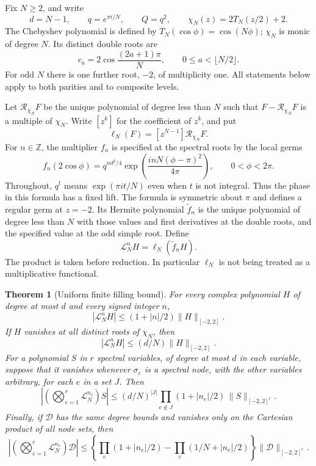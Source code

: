 \documentclass[11pt]{article}
\numberwithin{equation}{section}
\newtheorem{theorem}{Theorem}[section]
\theoremstyle{definition}\newtheorem{definition}[theorem]{Definition}
\theoremstyle{remark}\newtheorem{remark}[theorem]{Remark}
\begin{document}
Fix $N\ge2$, and write
\[
 d=N-1,\qquad q=e^{\pi i/N},\qquad Q=q^2,\qquad
 \chi_N(z)=2T_N(z/2)+2.
\]
The Chebyshev polynomial is defined by $T_N(\cos\phi)=\cos(N\phi)$;
$\chi_N$ is monic of degree $N$. Its distinct double roots are
\[
 c_a=2\cos\frac{(2a+1)\pi}{N},\qquad
 0\le a<\lfloor N/2\rfloor.
\]
For odd $N$ there is one further root, $-2$, of multiplicity one.
All statements below apply to both parities and to composite levels.

Let $\mathcal R_{\chi_N}F$ be the unique polynomial of degree less
than $N$ such that $F-\mathcal R_{\chi_N}F$ is a multiple of
$\chi_N$. Write $[z^k]$ for the coefficient of $z^k$, and put
\[
 \ell_N(F)=[z^{N-1}]\mathcal R_{\chi_N}F.
\]
For $n\in\mathbb Z$, the multiplier $f_n$ is specified at the spectral
roots by the local germs
\[
 f_n(2\cos\phi)=q^{nd^2/4}
       \exp\!\left(\frac{inN(\phi-\pi)^2}{4\pi}\right),
       \qquad 0<\phi<2\pi.
\]
Throughout, $q^t$ means $\exp(\pi i t/N)$ even when $t$ is not
integral. Thus the phase in this formula has a fixed lift.
The formula is symmetric about $\pi$ and defines a regular germ at
$z=-2$. Its Hermite polynomial $\widetilde f_n$ is the unique polynomial
of degree less than $N$ with those values and first derivatives at the
double roots, and the specified value at the odd simple root. Define
\[
             \mathcal L_N^nH=\ell_N(\widetilde f_nH).
\]
The product is taken before reduction. In particular $\ell_N$ is not
being treated as a multiplicative functional.

\begin{theorem}[Uniform finite filling bound]\label{fb:main}
For every complex polynomial $H$ of degree at most $d$ and every signed
integer $n$,
\begin{equation}\label{uf:eq-1}
 |\mathcal L_N^nH|\le(1+|n|/2)\|H\|_{[-2,2]}.
\end{equation}
If $H$ vanishes at all distinct roots of $\chi_N$, then
\begin{equation}\label{uf:eq-2}
 |\mathcal L_N^nH|\le(d/N)\|H\|_{[-2,2]}.
\end{equation}
For a polynomial $S$ in $r$ spectral variables, of degree at most $d$
in each variable, suppose that it vanishes whenever $\sigma_e$ is a
spectral node, with the other variables arbitrary, for each $e$ in a
set $J$. Then
\begin{equation}\label{uf:eq-3}
 \left|\left(\bigotimes_{e=1}^r\mathcal L_N^{n_e}\right)S\right|
 \le(d/N)^{|J|}\prod_{e\notin J}(1+|n_e|/2)\,
                         \|S\|_{[-2,2]^r}.
\end{equation}
Finally, if $\mathcal D$ has the same degree bounds and vanishes only
on the Cartesian product of all node sets, then
\begin{equation}\label{uf:eq-4}
 \left|\left(\bigotimes_{e=1}^r\mathcal L_N^{n_e}\right)\mathcal D\right|
 \le\left\{\prod_e(1+|n_e|/2)
       -\prod_e(1/N+|n_e|/2)\right\}\|\mathcal D\|_{[-2,2]^r}.
\end{equation}
\end{theorem}
\end{document}
